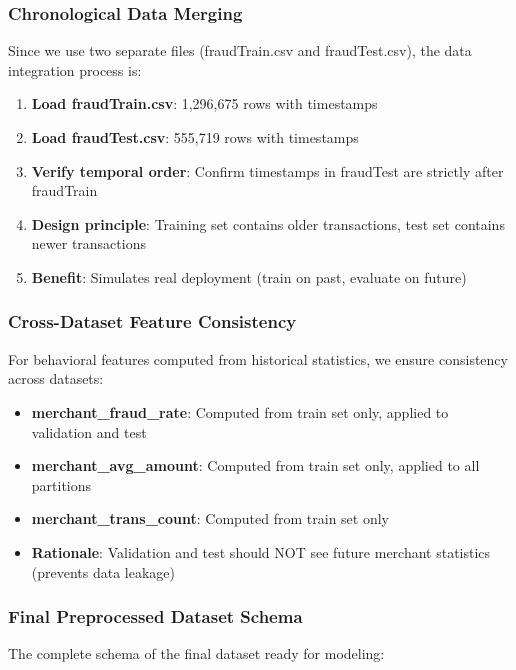 \subsubsection{Chronological Data Merging}

Since we use two separate files (fraudTrain.csv and fraudTest.csv), the data integration process is:

\begin{enumerate}
    \item \textbf{Load fraudTrain.csv}: 1,296,675 rows with timestamps
    \item \textbf{Load fraudTest.csv}: 555,719 rows with timestamps
    \item \textbf{Verify temporal order}: Confirm timestamps in fraudTest are strictly after fraudTrain
    \item \textbf{Design principle}: Training set contains older transactions, test set contains newer transactions
    \item \textbf{Benefit}: Simulates real deployment (train on past, evaluate on future)
\end{enumerate}

\subsubsection{Cross-Dataset Feature Consistency}

For behavioral features computed from historical statistics, we ensure consistency across datasets:

\begin{itemize}
    \item \textbf{merchant\_fraud\_rate}: Computed from train set only, applied to validation and test
    \item \textbf{merchant\_avg\_amount}: Computed from train set only, applied to all partitions
    \item \textbf{merchant\_trans\_count}: Computed from train set only
    \item \textbf{Rationale}: Validation and test should NOT see future merchant statistics (prevents data leakage)
\end{itemize}

\subsubsection{Final Preprocessed Dataset Schema}

The complete schema of the final dataset ready for modeling:

